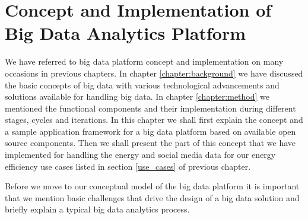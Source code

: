 \chapter[Big Data Analytics Platform]{Concept and Implementation of Big Data Analytics Platform}
\label{chapter:platform}
We have referred to big data platform concept and implementation on many occasions in previous chapters. In chapter \ref{chapter:background} we have discussed the basic concepts of big data with various technological advancements and solutions available for handling big data. In chapter \ref{chapter:method} we mentioned the functional components and their implementation during different stages, cycles and iterations. In this chapter we shall first explain the concept and a sample application framework for a big data platform based on available open source components. Then we shall present the part of this concept that we have implemented for handling the energy and social media data for our energy efficiency use cases listed in section \ref{use_cases} of previous chapter. 

Before we move to our conceptual model of the big data platform it is important that we mention basic challenges that drive the design of a big data solution and briefly explain a typical big data analytics process.

